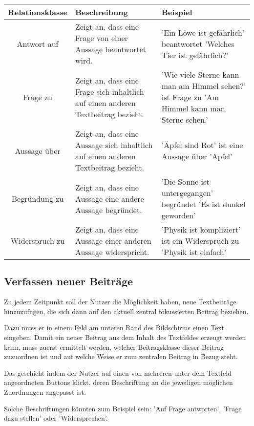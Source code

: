 \documentclass{article}
\begin{document}
\bigskip
\begin{tabular}{|c|p{7cm}|p{6cm}|}
	\hline
	Relationsklasse & Beschreibung & Beispiel\\
	\hline
	\cellcolor{green!35}Antwort auf & Zeigt an, dass eine Frage von einer Aussage beantwortet wird. & 'Ein Löwe ist gefährlich' beantwortet 'Welches Tier ist gefährlich?'\\
	\hline
	\cellcolor{blue!35}Frage zu & Zeigt an, dass eine Frage sich inhaltlich auf einen anderen Textbeitrag bezieht. & 'Wie viele Sterne kann man am Himmel sehen?' ist Frage zu 'Am Himmel kann man Sterne sehen.'\\
	\hline
	\cellcolor{brown!35}Aussage über & Zeigt an, dass eine Aussage sich inhaltlich auf einen anderen Textbeitrag bezieht. & 'Äpfel sind Rot' ist eine Aussage über 'Apfel'\\
	\hline
	\cellcolor{cyan!35}Begründung zu & Zeigt an, dass eine Aussage eine andere Aussage begründet. & 'Die Sonne ist untergegangen' begründet 'Es ist dunkel geworden'\\
	\hline
	\cellcolor{red!35}Widerspruch zu & Zeigt an, dass eine Aussage einer anderen Aussage widerspricht. & 'Physik ist kompliziert' ist ein Widerspruch zu 'Physik ist einfach'\\
	\hline
	
\end{tabular}
	
	\subsection{Verfassen neuer Beiträge}
	
	Zu jedem Zeitpunkt soll der Nutzer die Möglichkeit haben, neue Textbeiträge hinzuzufügen, die sich dann auf den aktuell zentral fokussierten Beitrag beziehen.
	
	\bigskip
	Dazu muss er in einem Feld am unteren Rand des Bildschirms einen Text eingeben. Damit ein neuer Beitrag aus dem Inhalt des Textfeldes erzeugt werden kann, muss zuerst ermittelt werden, welcher Beitragsklasse dieser Beitrag zuzuordnen ist und auf welche Weise er zum zentralen Beitrag in Bezug steht.
	
	\bigskip
	Das geschieht indem der Nutzer auf einen von mehreren unter dem Textfeld angeordneten Buttons klickt, deren Beschriftung an die jeweiligen möglichen Zuordnungen angepasst ist.
	
	\bigskip
	Solche Beschriftungen könnten zum Beispiel sein: 'Auf Frage antworten', 'Frage dazu stellen' oder 'Widersprechen'.
	
\end{document}
